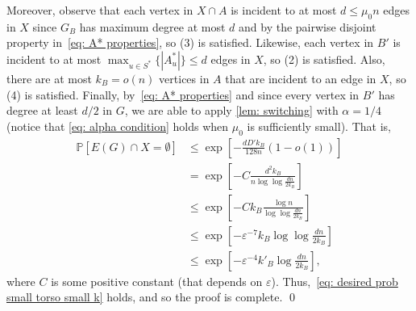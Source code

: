 \documentclass[11pt]{article}
\newcommand{\eps}{\varepsilon}
\def\P{\mathbb P}
\theoremstyle{plain}
\begin{document}
Moreover, observe that each vertex in $X \cap A$ is incident to at most $d \leq \mu_0n$ edges in $X$ since $G_B$ has maximum degree at most $d$ and by the pairwise disjoint property in~\eqref{eq: A* properties}, so (3) is satisfied. Likewise, each vertex in $B'$ is incident to at most $\max_{u \in S^*}\{|A^*_u|\} \leq d$ edges in $X$, so (2) is satisfied. Also, there are at most $k_B = o(n)$ vertices in $A$ that are incident to an edge in $X$, so (4) is satisfied. Finally, by~\eqref{eq: A* properties} and since every vertex in $B'$ has degree at least $d/2$ in $G$, we are able to apply \cref{lem: switching} with $\alpha = 1/4$ (notice that \eqref{eq: alpha condition} holds when $\mu_0$ is sufficiently small). That is,
\begin{align*}
    \P[E(G) \cap X = \emptyset] &\leq \exp\left[-\frac{dD'k_B}{128n}(1 - o(1))\right]\\
    &= \exp\left[-C\frac{d^2k_B}{n\log\log\frac{dn}{2k_B}}\right]\\
    &\leq \exp\left[-Ck_B\frac{\log n}{\log\log\frac{dn}{2k_B}}\right]\\
    &\leq \exp\left[-\eps^{-7}k_B\log\log\frac{dn}{2k_B}\right]\\
    &\leq \exp\left[ -\eps^{-4}k'_B\log\frac{dn}{2k_B}\right],
\end{align*}
where $C$ is some positive constant (that depends on $\eps$). Thus,~\eqref{eq: desired prob small torso small k} holds, and so the proof is complete.
\qed
\end{document}
